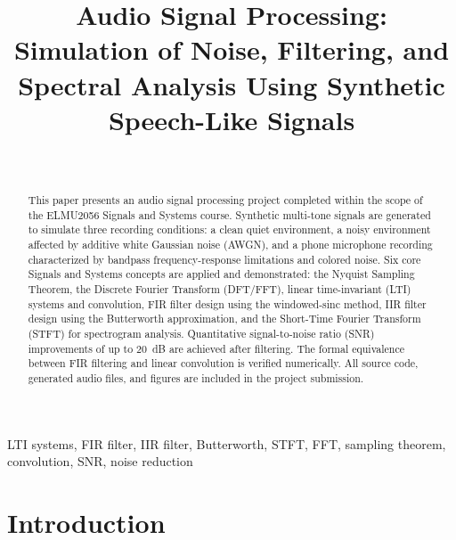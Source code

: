 \documentclass[journal]{IEEEtran}
\begin{document}
\title{Audio Signal Processing: Simulation of Noise, Filtering, and Spectral Analysis
       Using Synthetic Speech-Like Signals}

\author{%
  \\
}

\maketitle

\begin{abstract}
This paper presents an audio signal processing project completed within the scope
of the ELMU2056 Signals and Systems course. Synthetic multi-tone signals are
generated to simulate three recording conditions: a clean quiet environment, a
noisy environment affected by additive white Gaussian noise (AWGN), and a phone
microphone recording characterized by bandpass frequency-response limitations and
colored noise. Six core Signals and Systems concepts are applied and demonstrated:
the Nyquist Sampling Theorem, the Discrete Fourier Transform (DFT/FFT),
linear time-invariant (LTI) systems and convolution, FIR filter design using the
windowed-sinc method, IIR filter design using the Butterworth approximation, and
the Short-Time Fourier Transform (STFT) for spectrogram analysis. Quantitative
signal-to-noise ratio (SNR) improvements of up to 20~dB are achieved after
filtering. The formal equivalence between FIR filtering and linear convolution
is verified numerically. All source code, generated audio files, and figures
are included in the project submission.
\end{abstract}

\begin{IEEEkeywords}
LTI systems, FIR filter, IIR filter, Butterworth, STFT, FFT, sampling theorem,
convolution, SNR, noise reduction
\end{IEEEkeywords}

\section{Introduction}
\end{document}
